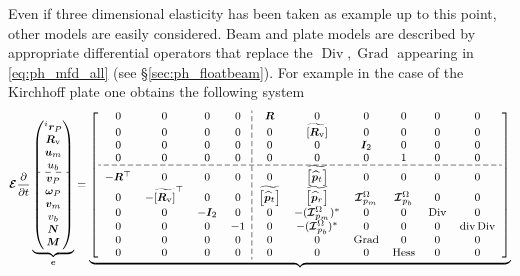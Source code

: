 \documentclass{svjour3}                     %
\newcommand{\secref}[1]{\S\ref{#1}}
\DeclareMathOperator*{\Grad}{Grad}
\DeclareMathOperator*{\Div}{Div}
\renewcommand{\div}{\operatorname{div}}
\DeclareMathOperator*{\Hess}{Hess}
\newcommand{\crmat}[1]{\ensuremath{\widetilde{\left[#1\right]}}}
\newcommand{\firstRev}[1]{\textcolor{red!80!black}{#1}}
\begin{document}
\begin{remark}
Even if three dimensional elasticity has been taken as example up to this point, other models are easily considered. Beam and plate models \cite{BRUGNOLI2019940,BRUGNOLI2019961} are described by appropriate differential operators that replace the $\Div, \Grad$ appearing in \eqref{eq:ph_mfd_all} (see \secref{sec:ph_floatbeam}). \firstRev{For example in the case of the Kirchhoff plate one obtains the following system
\begin{equation}
\footnotesize
\setlength{\dashlinegap}{2pt}
\bm{\mathcal{E}}
\diffp{}{t}
\underbrace{
	\begin{pmatrix}
	^i \bm{r}_P \\ \bm{R}_{\text{v}} \\ \bm{u}_{m} \\ {u}_{b} \\\hdashline  \bm{v}_P \\ \bm\omega_P  \\ \bm{v}_{m} \\ {v}_{b} \\ \bm{N} \\ \bm{M} \\
	\end{pmatrix}
}_{\bm{e}} = 
\underbrace{
	{\left[ \begin{array}{cccc:cccccc}
		0 & 0 & 0 & 0 &  \bm{R} & 0 & 0 & 0 & 0 & 0 \\
		0 & 0 & 0 & 0 & 0 & \crmat{\bm{R}_{\text{v}}} & 0 & 0 & 0  & 0\\
		0 & 0 & 0 & 0 & 0 & 0 & \bm{I}_{2} & 0 & 0  & 0 \\ 
		0 & 0 & 0 & 0 & 0 & 0 & 0 & 1 & 0  & 0 \\ 
		\hdashline
		-\bm{R}^\top & 0 & 0 & 0 & 0 & \crmat{\widehat{\bm{p}}_t} & 0 & 0  & 0  & 0\\
		0 & -\crmat{\bm{R}_{\text{v}}}^\top & 0 & 0 & \crmat{\widehat{\bm{p}}_t} & \crmat{\widehat{\bm{p}}_r} & \bm{\mathcal{I}}_{p_{m}}^\Omega & \bm{\mathcal{I}}_{p_{b}}^\Omega  & 0  & 0\\
		0 & 0 & -\bm{I}_{2} & 0 & 0 & -(\bm{\mathcal{I}}_{p_{m}}^\Omega)^* & 0 & 0  & \Div  & 0\\
		0 & 0 & 0 & -1& 0 & -(\bm{\mathcal{I}}_{p_b}^\Omega)^* & 0 & 0  & 0  & \div\Div\\
		0 & 0 & 0 & 0 & 0 & 0 & \Grad & 0  & 0  & 0\\
		0 & 0 & 0 & 0 & 0 & 0 & 0 & \Hess  & 0  & 0\\
		\end{array} \right]}
}
\end{equation}}
\end{remark}
\end{document}
